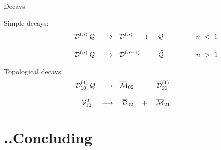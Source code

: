 \documentclass{beamer}
\begin{document}
\begin{frame}{Decays}

\vspace{-1.5mm}
\begin{block}{Simple decays:}
\begin{align*}
%
	~~~~~~~~~~~~~~
	\D^{(n)}\,\Q  & ~~\longrightarrow~~  \D^{(n)}  ~~~~+~~~  \Q
	\qquad\qquad~~ n ~<~ 1 
	\\[3mm]
%
	~~~~~~~~~~~~~~
	\D^{(n)}\,\Q  & ~~\longrightarrow~~  \D^{(n-1)}  ~~+~~  \wt{\Q}
	\qquad\qquad~~ n ~>~ 1 
\end{align*}
\end{block}

	\pause
\begin{block}{Topological decays:}
\begin{align*}
%
	\D_{10}^{(1)}\,\Q  & ~~\longrightarrow~~  \ov{\M}{}_{02}  ~~~+~~~  \ov{\D}{}_{21}^{(1)}
	~~~~~~
	\\[3mm]
%
	\V_{10}^2~\,        & ~~\longrightarrow~~  ~\ov{\D}{}_{02}  ~~~+~~~  \ov{\M}{}_{21}
	~~~~~~
\end{align*}
\end{block}

\end{frame}


\section{..Concluding}
\end{document}
